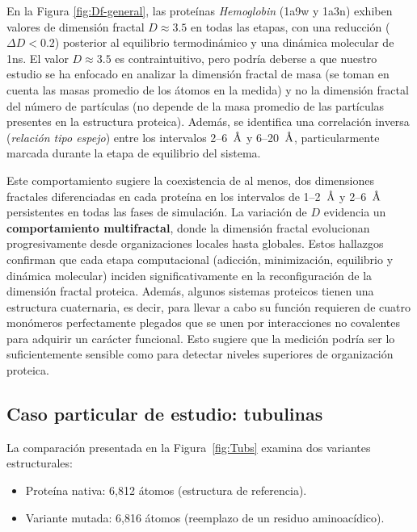 	
	
	
	En la Figura \ref{fig:Df-general}, las prote\'{i}nas \textit{Hemoglobin} (1a9w y 1a3n) exhiben valores de dimensi\'{o}n fractal $D \approx 3.5$ en todas las etapas, con una reducci\'{o}n  ($\Delta D < 0.2$) posterior al equilibrio termodin\'{a}mico y una din\'{a}mica molecular de 1ns. El valor $D \approx 3.5$  es contraintuitivo, pero podr\'{i}a deberse a que nuestro estudio se ha enfocado en analizar la dimensi\'{o}n fractal de masa (se toman en cuenta las masas promedio de los \'{a}tomos en la medida) y no la dimensi\'{o}n fractal del número de part\'{i}culas (no depende de la masa promedio de las part\'{i}culas presentes en la estructura proteica). Adem\'{a}s, se identifica una correlaci\'{o}n inversa (\emph{relaci\'{o}n tipo espejo}) entre los intervalos 2--6~$\textup{\r{A}}$ y 6--20~$\textup{\r{A}}$, particularmente marcada durante la etapa de equilibrio del sistema.
	
	Este comportamiento sugiere la coexistencia de al menos, dos dimensiones fractales diferenciadas en cada prote\'{i}na en los intervalos de 1--2~$\textup{\r{A}}$ y 2--6~$\textup{\r{A}}$ persistentes en todas las fases de simulaci\'{o}n. La variaci\'{o}n de $D$ evidencia un \textbf{comportamiento multifractal}, donde la dimensi\'{o}n fractal evolucionan progresivamente desde organizaciones locales hasta globales. Estos hallazgos confirman que cada etapa computacional (adicci\'{o}n, minimizaci\'{o}n, equilibrio y din\'{a}mica molecular) inciden significativamente en la reconfiguraci\'{o}n de la dimensi\'{o}n fractal proteica. Adem\'{a}s, algunos sistemas proteicos tienen una estructura cuaternaria, es decir, para llevar a cabo su función requieren de cuatro mon\'{o}meros perfectamente plegados que se unen por interacciones no covalentes para adquirir un car\'{a}cter funcional. Esto sugiere que la medición podría ser lo suficientemente sensible como para detectar niveles superiores de organización proteica.
	
	
	
	
	\subsection*{Caso particular de estudio: tubulinas}
	
	La comparaci\'{o}n presentada en la Figura~\ref{fig:Tubs} examina dos variantes estructurales:
	\begin{itemize}
		\item Prote\'{i}na nativa: 6,812 \'{a}tomos (estructura de referencia).
		\item Variante mutada: 6,816 \'{a}tomos (reemplazo de un residuo aminoac\'{i}dico).
	\end{itemize}
	

